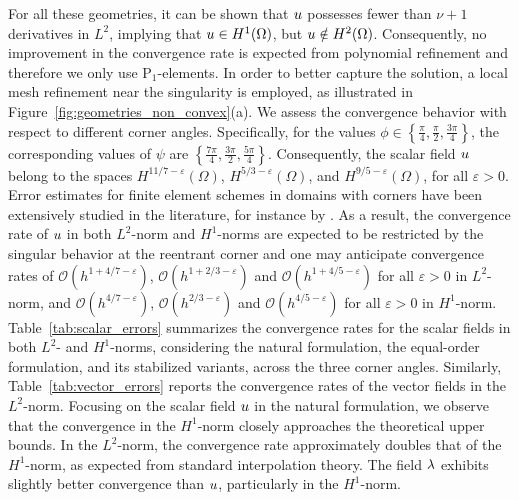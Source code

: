 For all these geometries, it can be shown that $u$ possesses fewer than $\nu+1$ derivatives in $L^{2}$, implying that $u \in H^{1}(\Omega)$, but $u \notin H^{2}(\Omega)$. Consequently, no improvement in the convergence rate is expected from polynomial refinement and therefore we only use $\text{P}_1$-elements.
In order to better capture the solution, a local mesh refinement near the singularity is employed, as illustrated in Figure~\ref{fig:geometries_non_convex}(a).
We assess the convergence behavior with respect to different corner angles. Specifically, for the values $ \phi \in \left\{ \frac{\pi}{4}, \frac{\pi}{2}, \frac{3\pi}{4} \right\} $, the corresponding values of $ \psi $ are $ \left\{ \frac{7\pi}{4}, \frac{3\pi}{2}, \frac{5\pi}{4} \right\} $. Consequently, the scalar field $ u $ belong to the spaces $ H^{11/7 - \varepsilon}(\Omega) $, $ H^{5/3 - \varepsilon}(\Omega) $, and $ H^{9/5 - \varepsilon}(\Omega) $, for all $ \varepsilon > 0 $. Error estimates for finite element schemes in domains with corners have been extensively studied in the literature, for instance by \cite{Babuska1972, Babuska1970}. As a result, the convergence rate of $ u $ in both $ L^{2} $-norm  and $ H^{1} $-norms are expected to be restricted by the singular behavior at the reentrant corner and one may anticipate convergence rates of $\mathcal{O}(h^{1+4/7-\varepsilon})$, $ \mathcal{O}(h^{1+2/3-\varepsilon}) $ and $ \mathcal{O}(h^{1+4/5-\varepsilon}) $ for all $ \varepsilon > 0 $ in $L^{2}$-norm, and $\mathcal{O}(h^{4/7-\varepsilon})$, $ \mathcal{O}(h^{2/3-\varepsilon}) $ and $ \mathcal{O}(h^{4/5-\varepsilon}) $ for all $ \varepsilon > 0 $ in $H^{1}$-norm. 
Table~\ref{tab:scalar_errors} summarizes the convergence rates for the scalar fields in both $ L^{2} $- and $ H^{1} $-norms, considering the natural formulation, the equal-order formulation, and its stabilized variants, across the three corner angles. Similarly, Table~\ref{tab:vector_errors} reports the convergence rates of the vector fields in the $ L^{2} $-norm.
Focusing on the scalar field $ u $ in the natural formulation, we observe that the convergence in the $ H^1 $-norm closely approaches the theoretical upper bounds. In the $ L^2 $-norm, the convergence rate approximately doubles that of the $ H^1 $-norm, as expected from standard interpolation theory. The field $ \lambda $ exhibits slightly better convergence than $ u $, particularly in the $ H^1 $-norm.
